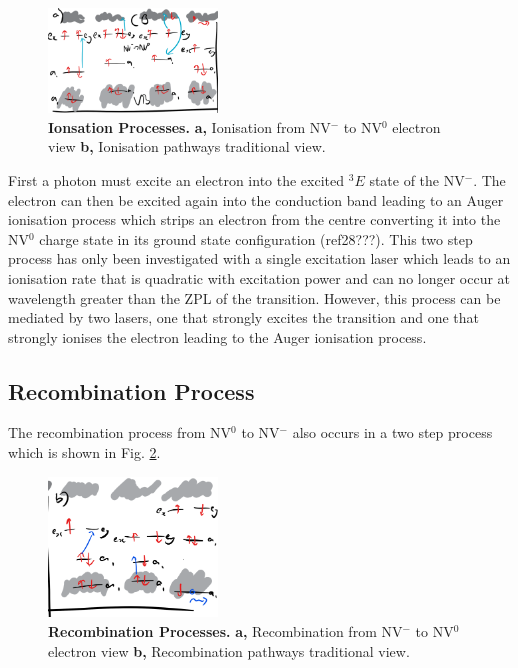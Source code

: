 \documentclass[,prl,twocolumn]{revtex4}
\begin{document}
\begin{figure}[H]
  \centering
  \includegraphics[width=0.4\textwidth]{ChargeConversiona.png} 
 \caption{\textbf{Ionsation Processes.} \textbf{a,} Ionisation from NV$^-$ to NV$^0$ electron view \textbf{b,} Ionisation pathways traditional view.} \label{FigChargeConversiona}
\end{figure}

First a photon must excite an electron into the excited $^3E$ state of the NV$^-$. The electron can then be excited again into the conduction band leading to an Auger ionisation process which strips an electron from the centre converting it into the NV$^0$ charge state in its ground state configuration (ref28???). This two step process has only been investigated with a single excitation laser which leads to an ionisation rate that is quadratic with excitation power and can no longer occur at wavelength greater than the ZPL of the transition. However, this process can be mediated by two lasers, one that strongly excites the transition and one that strongly ionises the electron leading to the Auger ionisation process.

\subsection{Recombination Process}
The recombination process from NV$^0$ to NV$^-$ also occurs in a two step process which is shown in Fig. \ref{FigChargeConversionb}.

\begin{figure}[H]
  \centering
  \includegraphics[width=0.4\textwidth]{ChargeConversionb.png} 
 \caption{\textbf{Recombination Processes.} \textbf{a,} Recombination from NV$^-$ to NV$^0$ electron view \textbf{b,} Recombination pathways traditional view.} \label{FigChargeConversionb}
\end{figure}
\end{document}
